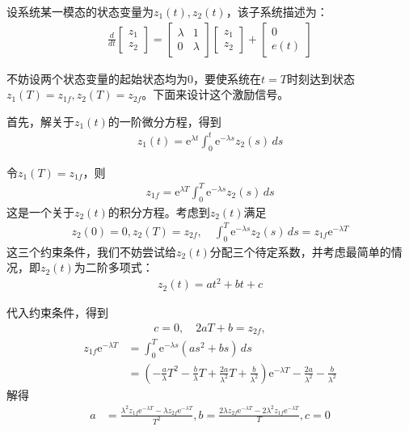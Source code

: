 \begin{example}
    设系统某一模态的状态变量为$z_1(t),z_2(t)$，该子系统描述为：\begin{align*}
    \frac{d}{dt}\begin{bmatrix}
    z_1\\
    z_2
    \end{bmatrix}=\begin{bmatrix}
    \lambda & 1\\
    0 & \lambda
    \end{bmatrix}\begin{bmatrix}
    z_1\\
    z_2
    \end{bmatrix}+\begin{bmatrix}
    0\\
    e(t)
    \end{bmatrix}
    \end{align*}

    不妨设两个状态变量的起始状态均为0，要使系统在$t=T$时刻达到状态$z_1(T)=z_{1f},z_2(T)=z_{2f}$。下面来设计这个激励信号。

    首先，解关于$z_1(t)$的一阶微分方程，得到\begin{align*}
    z_1(t)=\mathrm{e}^{\lambda t}\int_0^t \mathrm{e}^{-\lambda s}z_2(s)\,ds
    \end{align*}

    令$z_1(T)=z_{1f}$，则\begin{align*}
    z_{1f}=\mathrm{e}^{\lambda T}\int_0^T \mathrm{e}^{-\lambda s}z_2(s)\,ds
    \end{align*}
    这是一个关于$z_2(t)$的积分方程。考虑到$z_2(t)$满足\begin{align*}
    z_2(0)=0,z_2(T)=z_{2f},\quad \int_{0}^T \mathrm{e}^{-\lambda s}z_2(s)\,ds=z_{1f}\mathrm{e}^{-\lambda T}
    \end{align*}
    这三个约束条件，我们不妨尝试给$z_2(t)$分配三个待定系数，并考虑最简单的情况，即$z_2(t)$为二阶多项式：\begin{align*}
    z_2(t)=a t^2+bt+c
    \end{align*}

    代入约束条件，得到\begin{align*}
    c=0,\quad 2aT+b=z_{2f},
    \end{align*}
    \begin{align*}
    z_{1f}\mathrm{e}^{-\lambda T}&=\int_0^T \mathrm{e}^{-\lambda s}(a s^2+bs)\,ds\\
    &=\left(-\frac{a}{\lambda}T^2-\frac{b}{\lambda}T+\frac{2a}{\lambda^2}T+\frac{b}{\lambda^2}\right)\mathrm{e}^{-\lambda T}-\frac{2a}{\lambda^2}-\frac{b}{\lambda^2}
    \end{align*}
    解得\begin{align*}
    a&=\frac{\lambda^2 z_{1f}\mathrm{e}^{-\lambda T}-\lambda z_{2f}\mathrm{e}^{-\lambda T}}{T^2},b=\frac{2\lambda z_{2f}\mathrm{e}^{-\lambda T}-2\lambda^2 z_{1f}\mathrm{e}^{-\lambda T}}{T},c=0
    \end{align*}


\end{example}
